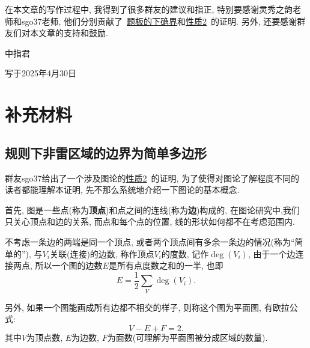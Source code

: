 \documentclass{ctexart}
\newcommand{\varible}[1]{{\Noto[#1]}}
\begin{document}
在本文章的写作过程中, 我得到了很多群友的建议和指正, 特别要感谢灵秀之韵老师和sgo37老师, 他们分别贡献了\ \hyperref[inf]{\varible{O}\varible{Q}题板的下确界}和\hyperref[p2]{性质2}\ 的证明. 另外, 还要感谢群友们对本文章的支持和鼓励.

\begin{flushright}
    中指君

    写于2025年4月30日
\end{flushright}
\pagebreak

\appendix

\section{补充材料}
\subsection{\varible{O}\varible{Q}规则下非雷区域的边界为简单多边形}
群友sgo37给出了一个涉及图论的\hyperref[p2]{性质2}\ 的证明, 为了使得对图论了解程度不同的读者都能理解本证明, 先不那么系统地介绍一下图论的基本概念.

首先, 图是一些点(称为\textbf{顶点})和点之间的连线(称为\textbf{边})构成的, 在图论研究中,我们只关心顶点和边的关系, 而点和每个点的位置, 线的形状如何都不在考虑范围内.

不考虑一条边的两端是同一个顶点, 或者两个顶点间有多余一条边的情况(称为``简单的''), 与$V_i$关联(连接)的边数, 称作顶点$V_i$的度数, 记作$\deg(V_i)$, 由于一个边连接两点, 所以一个图的边数$E$是所有点度数之和的一半, 也即
$$
E = \frac{1}{2}\sum_{V}\deg(V_i).
$$

另外, 如果一个图能画成所有边都不相交的样子, 则称这个图为平面图, 有欧拉公式:
$$
V - E + F = 2.
$$
其中$V$为顶点数, $E$为边数, $F$为面数(可理解为平面图被分成区域的数量).
\end{document}
